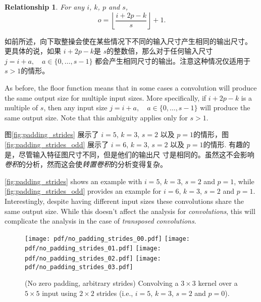\documentclass[notitlepage]{report}
\newtheorem{relationship}{Relationship}
\begin{document}
\begin{relationship}\label{rel:padding_strides}
For any $i$, $k$, $p$ and $s$,
\begin{equation*}
    o = \left\lfloor \frac{i + 2p - k}{s} \right\rfloor + 1.
\end{equation*}
\end{relationship}

\noindent 如前所述，向下取整操会使在某些情况下不同的输入尺寸产生相同的输出尺寸。 更具体的说，如果
$i + 2p - k$是 $s$的整数倍，那么对于任何输入尺寸$j = i + a, \quad a \in \{0,\ldots,s - 1\}$
都会产生相同尺寸的输出。注意这种情况仅适用于$s > 1$的情形。

\noindent As before, the floor function means that in some cases a convolution
will produce the same output size for multiple input sizes. More specifically,
if $i + 2p - k$ is a multiple of $s$, then any input size $j = i + a, \quad a
\in \{0,\ldots,s - 1\}$ will produce the same output size. Note that this
ambiguity applies only for $s > 1$.

图\autoref{fig:padding_strides} 展示了 $i = 5$, $k = 3$, $s = 2$
以及 $p = 1$的情形，图 \autoref{fig:padding_strides_odd} 展示了
$i = 6$, $k = 3$, $s = 2$ 以及 $p = 1$的情形. 有趣的是，尽管输入特征图尺寸不同，但是他们的输出尺
寸是相同的。虽然这不会影响{\em 卷积}的分析，然而这会使{\em 转置卷积}的分析变得复杂。

\autoref{fig:padding_strides} shows an example with $i = 5$, $k = 3$, $s = 2$
and $p = 1$, while \autoref{fig:padding_strides_odd} provides an example for
$i = 6$, $k = 3$, $s = 2$ and $p = 1$. Interestingly, despite having different
input sizes these convolutions share the same output size. While this doesn't
affect the analysis for {\em convolutions}, this will complicate the analysis
in the case of {\em transposed convolutions}.

\begin{figure}[p]
    \centering
    \texttt{[image: pdf/no\_padding\_strides\_00.pdf]}
    \texttt{[image: pdf/no\_padding\_strides\_01.pdf]}
    \texttt{[image: pdf/no\_padding\_strides\_02.pdf]}
    \texttt{[image: pdf/no\_padding\_strides\_03.pdf]}
    \caption{\label{fig:no_padding_strides} (No zero padding, arbitrary
        strides) Convolving a $3 \times 3$ kernel over a $5 \times 5$ input
        using $2 \times 2$ strides (i.e., $i = 5$, $k = 3$, $s = 2$ and
        $p = 0$).}
\end{figure}
\end{document}
